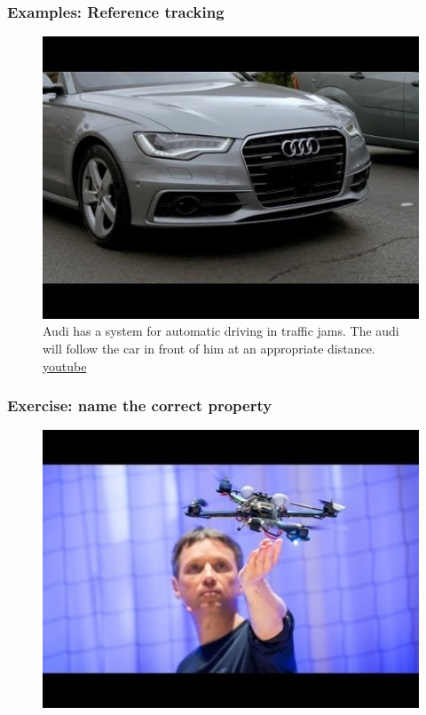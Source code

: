 \begin{frame}
	\frametitle{Examples: Reference tracking}
	\begin{figure}
\centering
\includegraphics[width=0.7\linewidth]{audi-tracking}
\caption{Audi has a system for automatic driving in traffic jams. The audi will follow the car in front of him at an appropriate distance. \href{https://www.youtube.com/watch?v=Qa_ZSRj0WM0}{youtube}}
\label{fig:audi-tracking}
\end{figure}
\end{frame}

\begin{frame}
	\frametitle{Exercise: name the correct property}
	\begin{figure}
\centering
\includegraphics[width=0.7\linewidth]{ted-drone}
\label{fig:ted-drone}
\end{figure}

\end{frame}
